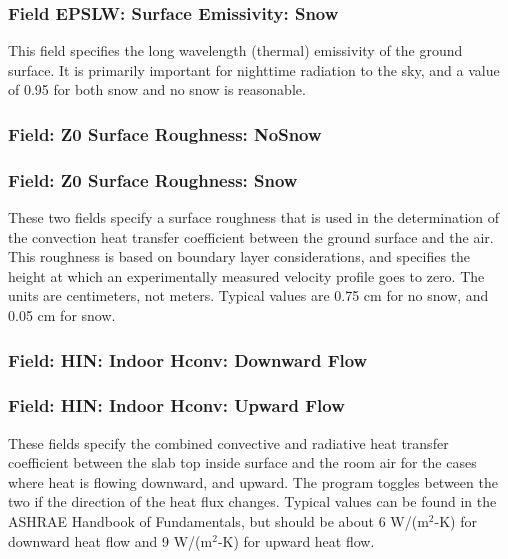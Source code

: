 \subsubsection{Field EPSLW: Surface Emissivity: Snow}\label{field-epslw-surface-emissivity-snow}

This field specifies the long wavelength (thermal) emissivity of the ground surface. It is primarily important for nighttime radiation to the sky, and a value of 0.95 for both snow and no snow is reasonable.

\subsubsection{Field: Z0 Surface Roughness: NoSnow}\label{field-z0-surface-roughness-nosnow}

\subsubsection{Field: Z0 Surface Roughness: Snow}\label{field-z0-surface-roughness-snow}

These two fields specify a surface roughness that is used in the determination of the convection heat transfer coefficient between the ground surface and the air. This roughness is based on boundary layer considerations, and specifies the height at which an experimentally measured velocity profile goes to zero. The units are centimeters, not meters. Typical values are 0.75 cm for no snow, and 0.05 cm for snow.

\subsubsection{Field: HIN: Indoor Hconv: Downward Flow}\label{field-hin-indoor-hconv-downward-flow}

\subsubsection{Field: HIN: Indoor Hconv: Upward Flow}\label{field-hin-indoor-hconv-upward-flow}

These fields specify the combined convective and radiative heat transfer coefficient between the slab top inside surface and the room air for the cases where heat is flowing downward, and upward. The program toggles between the two if the direction of the heat flux changes. Typical values can be found in the ASHRAE Handbook of Fundamentals, but should be about 6 W/(m\(^{2}\)-K) for downward heat flow and 9 W/(m\(^{2}\)-K) for upward heat flow.

